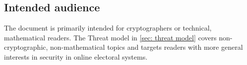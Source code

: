 \subsection{Intended audience}
The document is primarily intended for cryptographers or technical, mathematical readers. The Threat model in \cref{sec: threat model} covers non-cryptographic, non-mathematical topics and targets readers with more general interests in security in online electoral systems.
